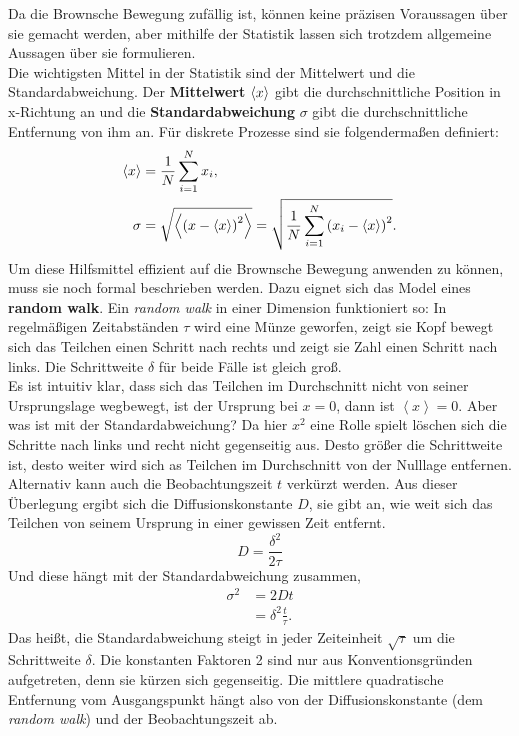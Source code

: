 Da die Brownsche Bewegung zufällig ist, können keine präzisen Voraussagen über sie gemacht werden, aber mithilfe der Statistik lassen sich trotzdem allgemeine Aussagen über sie formulieren.\\
Die wichtigsten Mittel in der Statistik sind der Mittelwert und die Standardabweichung. Der \textbf{Mittelwert} $\left< x \right>$ gibt die durchschnittliche Position in x-Richtung an und die \textbf{Standardabweichung} $\sigma$ gibt die durchschnittliche Entfernung von ihm an. Für diskrete Prozesse sind sie folgendermaßen definiert:
\begin{align}
  \left< x \right> & = \frac{1}{N} \sum_{i=1}^{N} x_i, \\
  \sigma & = \sqrt{\left<  {\left( x - \left< x \right> \right)}^2  \right>} = \sqrt{\frac{1}{N} \sum_{i=1}^{N} {\left( x_i - \left< x \right> \right)}^2}.
\end{align}
Um diese Hilfsmittel effizient auf die Brownsche Bewegung anwenden zu können, muss sie noch formal beschrieben werden. Dazu eignet sich das Model eines \textbf{random walk}. Ein \emph{random walk} in einer Dimension funktioniert so: In regelmäßigen Zeitabständen $\tau$ wird eine Münze geworfen, zeigt sie Kopf bewegt sich das Teilchen einen Schritt nach rechts und zeigt sie Zahl einen Schritt nach links. Die Schrittweite $\delta$ für beide Fälle ist gleich groß.\\
Es ist intuitiv klar, dass sich das Teilchen im Durchschnitt nicht von seiner Ursprungslage wegbewegt, ist der Ursprung bei $x = 0$, dann ist $\left< x \right> = 0$. Aber was ist mit der Standardabweichung? Da hier $x^2$ eine Rolle spielt löschen sich die Schritte nach links und recht nicht gegenseitig aus.
Desto größer die Schrittweite ist, desto weiter wird sich as Teilchen im Durchschnitt von der Nulllage entfernen. Alternativ kann auch die Beobachtungszeit $t$ verkürzt werden. Aus dieser Überlegung ergibt sich die Diffusionskonstante $D$, sie gibt an, wie weit sich das Teilchen von seinem Ursprung in einer gewissen Zeit entfernt.
\begin{equation}
  D = \frac{\delta^2}{2 \tau}
\end{equation}
Und diese hängt mit der Standardabweichung zusammen,
\begin{align}
  \sigma^2 & = 2Dt \label{eq:diff} \\
   & = \delta^2 \frac{t}{\tau}.
\end{align}
Das heißt, die Standardabweichung steigt in jeder Zeiteinheit $\sqrt{\tau}$ um die Schrittweite $\delta$. Die konstanten Faktoren 2 sind nur aus Konventionsgründen aufgetreten, denn sie kürzen sich gegenseitig. Die mittlere quadratische Entfernung vom Ausgangspunkt hängt also von der Diffusionskonstante (dem \emph{random walk}) und der Beobachtungszeit ab.\\


